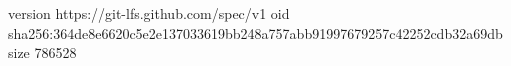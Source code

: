 version https://git-lfs.github.com/spec/v1
oid sha256:364de8e6620c5e2e137033619bb248a757abb91997679257c42252cdb32a69db
size 786528
